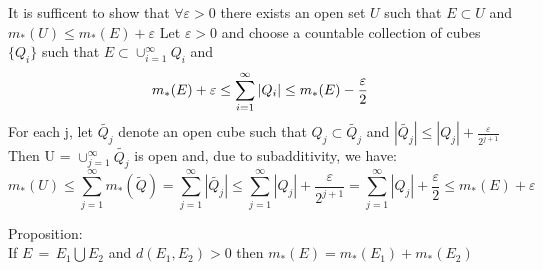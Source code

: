 \documentclass{article}[12 pt]
\begin{document}
\begin{enumerate}
	      It is sufficent to show that $\forall \varepsilon > 0$ there exists an open set $U$ such that $E \subset U$ and $m_{*}(U) \leq m_{*}(E) + \varepsilon$
	      Let $\varepsilon > 0$ and choose a countable collection of cubes $\{Q_i\}$ such that $E \subset \cup_{i=1}^{\infty}Q_i$ and
	      \begin{equation}
		      m_{*}(E) + \varepsilon \leq \sum_{i=1}^{\infty}|Q_i| \leq m_{*}(E) - \frac{\varepsilon}{2}\\
	      \end{equation}
	      For each j, let $\tilde{Q_{j}}$ denote an open cube such that $Q_{j} \subset \tilde{Q_{j}}$ and $|\tilde{Q_{j}}| \leq |Q_{j}| + \frac{\varepsilon}{2^{j+1}}$
	      Then U = $\cup_{j=1}^{\infty}\tilde{Q_{j}}$ is open and, due to subadditivity, we have:
	      \begin{equation}
		      m_{*}(U) \leq \sum_{j=1}^{\infty}m_{*}(\tilde{Q}) = \sum_{j=1}^{\infty}|\tilde{Q_{j}}| \leq \sum_{j=1}^{\infty}|Q_{j}| + \frac{\varepsilon}{2^{j+1}} = \sum_{j=1}^{\infty}|Q_{j}| + \frac{\varepsilon}{2}  \leq m_{*}(E) + \varepsilon
	      \end{equation}

	      Proposition:\\
	      If $E\,=\,E_1\bigcup E_2$ and $d(E_1,E_2) > 0$ then $m_{*}(E) = m_{*}(E_1) + m_{*}(E_2)$\\


\end{enumerate}
\end{document}
